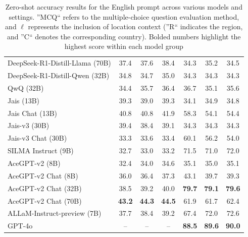 \begin{table}[t]
{\begin{tabular}{lcccccc}
\hline
DeepSeek-R1-Distill-Llama (70B)  & 37.4 & 37.6 & 38.4 & 34.3 & 35.2 & 34.5 \\
DeepSeek-R1-Distill-Qwen (32B) & 34.8 & 34.7 & 35.0 & 34.3 & 34.3 & 34.3 \\
QwQ (32B)& 34.4 & 35.7 & 36.4 & 36.7 & 35.1 & 35.6 \\
\hline
Jais (13B)                                    & 39.3         & 39.0           & 39.3                      & 34.1         & 34.9            & 34.8                       \\
Jais Chat (13B)                               & 40.8         & 40.8           & 41.9                      & 58.3         & 54.1            & 54.4                       \\
Jais-v3 (30B)                                 & 39.4         & 38.4           & 39.1                      & 34.3         & 34.3            & 34.3                       \\
Jais-v3 Chat (30B)                            & 33.3         & 33.6            & 33.4                      & 60.1         & 56.2            & 54.0                       \\
\hdashline
SILMA Instruct (9B)                           & 32.7         & 33.0           & 33.2                      & 71.5         & 71.0            & 72.0                         \\
\hdashline
AceGPT-v2 (8B)                                & 32.4         & 34.0           & 34.6                     & 35.1         & 35.0           & 35.1                      \\
AceGPT-v2 Chat (8B)                           & 36.0         & 36.4           & 37.3                     & 43.1         & 39.7           & 39.3                      \\
AceGPT-v2 Chat (32B)                          & 38.5         & 39.2            & 40.0                     & \textbf{79.7}         & \textbf{79.1}           & \textbf{79.6}                      \\
AceGPT-v2 Chat (70B)                          & \textbf{43.2}         & \textbf{44.3}           & \textbf{44.5}                     & 61.9         & 61.7           & 62.4                      \\
\hdashline
ALLaM-Instruct-preview (7B)                           & 37.7         & 38.4           & 39.2                      & 67.4         & 72.0            & 72.6                         \\
\hline
GPT-4o                                        &     --          &                -- & --                          & \textbf{88.5}         & \textbf{89.6}            & \textbf{90.0}                        \\
\hline
\end{tabular}%
}
\caption{Zero-shot accuracy results for the English prompt across various models and settings. ''MCQ`` refers to the multiple-choice question evaluation method, and  $\ell$ represents the inclusion of location context (''R`` indicates the region, and ''C`` denotes the corresponding country). Bolded numbers highlight the highest score within each model group}
\label{tab:model_scores}
\end{table}
